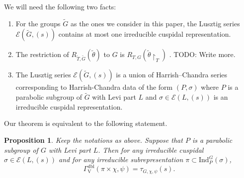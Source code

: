 \documentclass[12pt, reqno]{amsart}
\newtheorem{proposition}[theorem]{Proposition}
\theoremstyle{definition}
\theoremstyle{definition}
\theoremstyle{definition}
\newcommand{\hermitianSpace}{\mathrm{V}}
\newcommand{\fieldCharacter}{\psi}
\newcommand{\Ind}[3]{\mathrm{Ind}_{#1}^{#2}\left(#3\right)}
\newcommand{\GroupExtension}[1]{\widetilde{#1}}
\newcommand{\dblGammaFactorSpace}[4]{\Gamma^{\mathrm{dbl}}_{#1}\left(#2 \times #3, #4\right)}
\newcommand{\LusztigSeries}[2]{\mathcal{E}\left(#1, (#2)\right)}
\begin{document}
We will need the following two facts:
\begin{enumerate}
	\item For the groups $\GroupExtension{G}$ as the ones we consider in this paper, the Lusztig series $\LusztigSeries{\GroupExtension{G}}{s}$ contains at most one irreducible cuspidal representation.
	\item The restriction of $R_{\GroupExtension{T},\GroupExtension{G}} \left(\GroupExtension{\theta}\right)$ to $G$ is $R_{T, G} \left(\tilde{\theta} \restriction_T\right)$ \cite[Page 140]{DigneMichel2020}. TODO: Write more.
	\item The Lusztig series $\LusztigSeries{\GroupExtension{G}}{s}$ is a union of Harrish--Chandra series corresponding to Harrish-Chandra data of the form $\left(P,\sigma\right)$ where $P$ is a parabolic subgroup of $\GroupExtension{G}$ with Levi part $L$ and $\sigma \in \LusztigSeries{L}{s}$ is an irreducible cuspidal representation.
\end{enumerate}
Our theorem is equivalent to the following statement.
\begin{proposition}\label{prop:gamma-factor-is-constant-on-lusztig-series}
	Keep the notations as above. Suppose that $P$ is a parabolic subgroup of $G$ with Levi part $L$. Then for any irreducible cuspidal $\sigma \in \LusztigSeries{L}{s}$ and for any irreducible subrepresentation $\pi \subset \Ind{P}{G}{\sigma}$, $$\dblGammaFactorSpace{\hermitianSpace}{\pi}{\chi}{\fieldCharacter} = \tau_{G, \chi, \fieldCharacter}\left(s\right).$$
\end{proposition}
\end{document}
